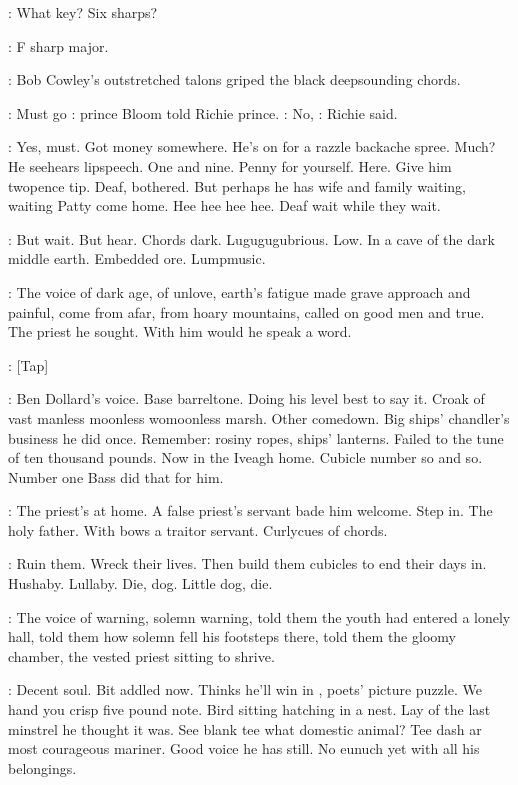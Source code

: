 \cowley:
What key?
Six sharps?

\dollard:
F sharp major.

:
Bob Cowley's outstretched talons griped the
black deepsounding chords.

\BloomInt:
Must go
:
prince Bloom told Richie prince.
\goulding:
No,
:
Richie said.

\BloomInt:
Yes,
must.
Got money somewhere.
He's on for a razzle backache spree.
Much?
He
seehears lipspeech.
One and nine.
Penny for yourself.
Here.
Give him
twopence tip.
Deaf,
bothered.
But perhaps he has wife and family waiting,
waiting Patty come home.
Hee hee hee hee.
Deaf wait while they wait.

\BloomInt:
But wait.
But hear.
Chords dark.
Lugugugubrious.
Low.
In a cave of
the dark middle earth.
Embedded ore.
Lumpmusic.

:
The voice of dark age,
of unlove,
earth's fatigue made grave approach
and painful,
come from afar,
from hoary mountains,
called on good men
and true.
The priest he sought.
With him would he speak a word.

\stripling:
[Tap]

\BloomInt:
Ben Dollard's voice.
Base barreltone.
Doing his level best to say it.
Croak of vast manless moonless womoonless marsh.
Other comedown.
Big
ships' chandler's business he did once.
Remember:
rosiny ropes,
ships'
lanterns.
Failed to the tune of ten thousand pounds.
Now in the Iveagh
home.
Cubicle number so and so.
Number one Bass did that for him.

:
The priest's at home.
A false priest's servant bade him welcome.
Step
in.
The holy father.
With bows a traitor servant.
Curlycues of chords.

\BloomInt:
Ruin them.
Wreck their lives.
Then build them cubicles to end their
days in.
Hushaby.
Lullaby.
Die,
dog.
Little dog,
die.

:
The voice of warning,
solemn warning,
told them the youth had
entered a lonely hall,
told them how solemn fell his footsteps there,
told
them the gloomy chamber,
the vested priest sitting to shrive.

\BloomInt:
Decent soul.
Bit addled now.
Thinks he'll win in
,
poets' picture puzzle.
We hand you crisp five pound note.
Bird sitting hatching
in a nest.
Lay of the last minstrel he thought it was.
See blank tee what
domestic animal?
Tee dash ar most courageous mariner.
Good voice he has
still.
No eunuch yet with all his belongings.

